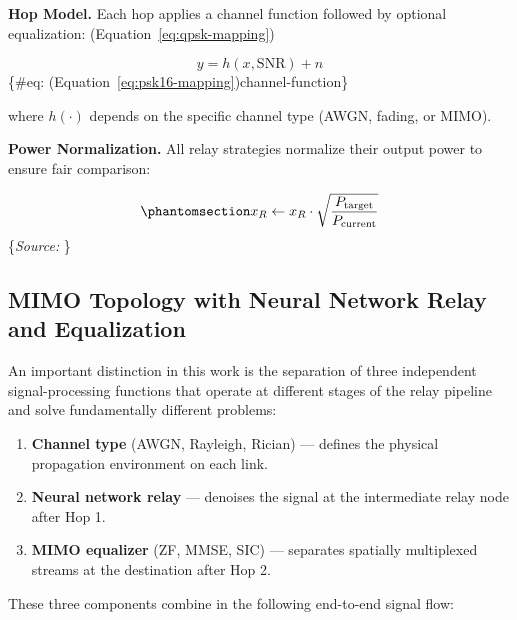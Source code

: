 \documentclass[
  english,
  12pt,
  12pt,
  a4paper,
  oneside]{report}
\providecommand{\tightlist}{%
  \setlength{\itemsep}{0pt}\setlength{\parskip}{0pt}}
\begin{document}
\textbf{Hop Model.} Each hop applies a channel function followed by optional equalization: (Equation~\ref{eq:qpsk-mapping})

\[y = h(x, \text{SNR}) + n
\] \{\#eq: (Equation~\ref{eq:psk16-mapping})channel-function\}

where \(h(\cdot)\) depends on the specific channel type (AWGN, fading, or MIMO).

\textbf{Power Normalization.} All relay strategies normalize their output power to ensure fair comparison:

\begin{equation}\protect\phantomsection\label{eq:power-normalization}{x_R \leftarrow x_R \cdot \sqrt{\frac{P_{\text{target}}}{P_{\text{current}}}}
}\end{equation} \footnotesize\{\textit{Source: \1}\}\normalsize

\subsection{MIMO Topology with Neural Network Relay and Equalization}\label{sec:mimo-topology-with-neural-network-relay-and-equalization}

An important distinction in this work is the separation of three independent signal-processing functions that operate at different stages of the relay pipeline and solve fundamentally different problems:

\begin{enumerate}
\def\labelenumi{\arabic{enumi}.}
\tightlist
\item
  \textbf{Channel type} (AWGN, Rayleigh, Rician) --- defines the physical propagation environment on each link.
\item
  \textbf{Neural network relay} --- denoises the signal at the intermediate relay node after Hop 1.
\item
  \textbf{MIMO equalizer} (ZF, MMSE, SIC) --- separates spatially multiplexed streams at the destination after Hop 2.
\end{enumerate}

These three components combine in the following end-to-end signal flow:
\end{document}
